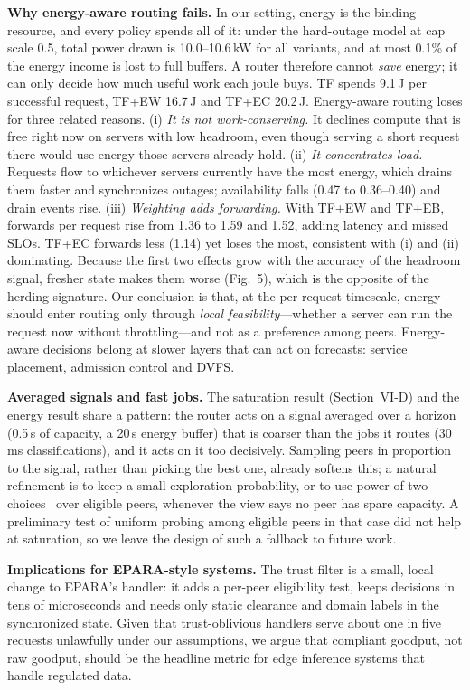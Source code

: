 \documentclass{article}
\begin{document}
\textbf{Why energy-aware routing fails.}
In our setting, energy is the binding resource, and every policy spends all of it: under the hard-outage model at cap scale 0.5, total power drawn is 10.0--10.6\,kW for all variants, and at most 0.1\% of the energy income is lost to full buffers. A router therefore cannot \emph{save} energy; it can only decide how much useful work each joule buys. TF spends 9.1\,J per successful request, TF+EW 16.7\,J and TF+EC 20.2\,J. Energy-aware routing loses for three related reasons.
(i) \emph{It is not work-conserving.} It declines compute that is free right now on servers with low headroom, even though serving a short request there would use energy those servers already hold.
(ii) \emph{It concentrates load.} Requests flow to whichever servers currently have the most energy, which drains them faster and synchronizes outages; availability falls (0.47 to 0.36--0.40) and drain events rise.
(iii) \emph{Weighting adds forwarding.} With TF+EW and TF+EB, forwards per request rise from 1.36 to 1.59 and 1.52, adding latency and missed SLOs. TF+EC forwards less (1.14) yet loses the most, consistent with (i) and (ii) dominating.
Because the first two effects grow with the accuracy of the headroom signal, fresher state makes them worse (Fig.~5), which is the opposite of the herding signature. Our conclusion is that, at the per-request timescale, energy should enter routing only through \emph{local feasibility}---whether a server can run the request now without throttling---and not as a preference among peers. Energy-aware decisions belong at slower layers that can act on forecasts: service placement, admission control and DVFS.

\textbf{Averaged signals and fast jobs.}
The saturation result (Section~VI-D) and the energy result share a pattern: the router acts on a signal averaged over a horizon (0.5\,s of capacity, a 20\,s energy buffer) that is coarser than the jobs it routes (30\,ms classifications), and it acts on it too decisively. Sampling peers in proportion to the signal, rather than picking the best one, already softens this; a natural refinement is to keep a small exploration probability, or to use power-of-two choices~\cite{mitzenmacher2001two} over eligible peers, whenever the view says no peer has spare capacity. A preliminary test of uniform probing among eligible peers in that case did not help at saturation, so we leave the design of such a fallback to future work.

\textbf{Implications for EPARA-style systems.}
The trust filter is a small, local change to EPARA's handler: it adds a per-peer eligibility test, keeps decisions in tens of microseconds and needs only static clearance and domain labels in the synchronized state. Given that trust-oblivious handlers serve about one in five requests unlawfully under our assumptions, we argue that compliant goodput, not raw goodput, should be the headline metric for edge inference systems that handle regulated data.
\end{document}
